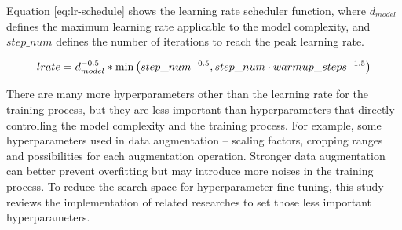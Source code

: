 Equation \ref{eq:lr-schedule} shows the learning rate scheduler function, where $d_{model}$ defines the maximum learning rate applicable to the model complexity, and $step\_num$ defines the number of iterations to reach the peak learning rate.

\begin{equation}
    lrate=d_{model}^{-0.5} * \min \left(step\_num^{-0.5}, step\_num \cdot  warmup\_steps^{-1.5}\right)
    \eqcite{vaswani2017attention}
    \label{eq:lr-schedule}
\end{equation}

There are many more hyperparameters other than the learning rate for the training process, but they are less important than hyperparameters that directly controlling the model complexity and the training process.
For example, some hyperparameters used in data augmentation -- scaling factors, cropping ranges and possibilities for each augmentation operation.
Stronger data augmentation can better prevent overfitting but may introduce more noises in the training process.
To reduce the search space for hyperparameter fine-tuning, this study reviews the implementation of related researches to set those less important hyperparameters.
